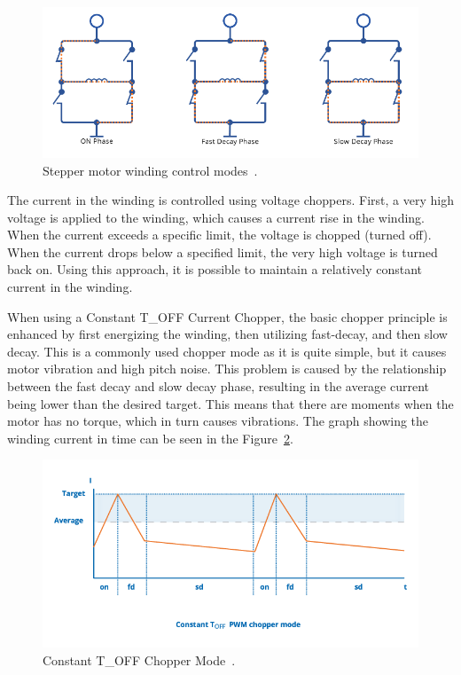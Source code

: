 \begin{figure}[H]
    \centering
    \includegraphics[width=\textwidth]{obrazky/winding_modes}
    \caption{Stepper motor winding control modes~\cite{trinamic_chopper_nodate}.}
    \label{fig:current_phases}
\end{figure}

The current in the winding is controlled using voltage choppers.
First, a very high voltage is applied to the winding, which causes a current rise in the winding.
When the current exceeds a specific limit, the voltage is chopped (turned off).
When the current drops below a specified limit, the very high voltage is turned back on.
Using this approach, it is possible to maintain a relatively constant current in the winding\cite{trinamic_chopper_nodate}.

When using a Constant T\_OFF Current Chopper, the basic chopper principle is enhanced by first energizing the winding, then utilizing fast-decay, and then slow decay.
This is a commonly used chopper mode as it is quite simple, but it causes motor vibration and high pitch noise.
This problem is caused by the relationship between the fast decay and slow decay phase, resulting in the average current being lower than the desired target.
This means that there are moments when the motor has no torque, which in turn causes vibrations\cite{trinamic_chopper_nodate}.
The graph showing the winding current in time can be seen in the Figure~\ref{fig:t_off_chopper}.

\begin{figure}[H]
    \centering
    \includegraphics[width=\textwidth]{obrazky/t_off_chopper}
    \caption{Constant T\_OFF Chopper Mode~\cite{trinamic_chopper_nodate}.}
    \label{fig:t_off_chopper}
\end{figure}

